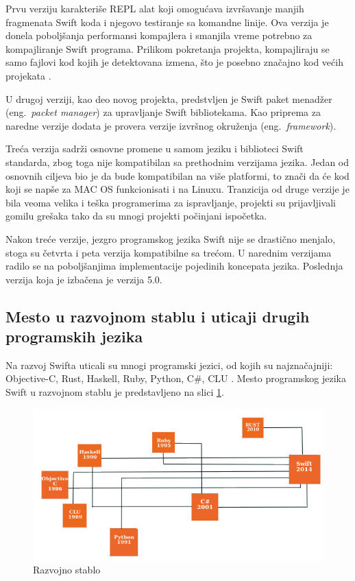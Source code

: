 \documentclass[a4paper]{article}
\begin{document}
Prvu verziju karakteriše REPL alat koji omogućava izvršavanje  manjih fragmenata Swift koda i njegovo testiranje sa komandne linije. Ova verzija je donela poboljšanja performansi kompajlera i smanjila vreme potrebno za kompajliranje Swift programa. Prilikom pokretanja projekta, kompajliraju se samo fajlovi kod kojih je detektovana izmena, što je posebno značajno kod većih projekata \cite{swiftdev_sajt}. 

U drugoj verziji, kao deo novog projekta, predstvljen je Swift paket menadžer (eng.~{\em packet manager}) za upravljanje Swift bibliotekama. Kao priprema za naredne verzije dodata je provera verzije izvršnog okruženja (eng.~{\em framework}). 

Treća verzija sadrži osnovne promene u samom jeziku i biblioteci Swift standarda, zbog toga nije kompatibilan sa prethodnim verzijama jezika. Jedan od osnovnih ciljeva bio je da bude kompatibilan na više platformi, to znači da će kod koji se napše za MAC OS funkcionisati i na Linuxu. Tranzicija od druge verzije je bila veoma velika i teška programerima za ispravljanje, projekti su prijavljivali gomilu grešaka tako da su mnogi projekti počinjani ispočetka. 

Nakon treće verzije, jezgro programskog jezika Swift nije se drastično menjalo, stoga su četvrta i peta verzija kompatibilne sa trećom. U narednim verzijama radilo se na poboljšanjima implementacije pojedinih koncepata jezika. Poslednja verzija koja je izbačena je verzija 5.0.
  
\subsection{Mesto u razvojnom stablu i uticaji drugih programskih jezika}
\label{subsec:podnaslov6}
Na razvoj Swifta uticali su mnogi programski jezici, od kojih su najznačajniji: Objective-C, Rust, Haskell, Ruby, Python, C\#, CLU \cite{chris_sajt}. Mesto programskog jezika Swift u razvojnom stablu je predstavljeno na slici \ref{fig:razvojno_stablo}.

\begin{figure}[h!]
\begin{center}
\includegraphics[scale=0.5]{razvojno_stablo.jpg}
\end{center}
\caption{Razvojno stablo}
\label{fig:razvojno_stablo}
\end{figure}
\end{document}
